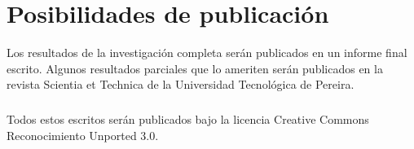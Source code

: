 \chapter{Posibilidades de publicaci\'on}
\label{sec:posibilidades}
Los resultados de la investigaci\'on completa ser\'an publicados en un informe final escrito. Algunos resultados parciales que lo ameriten ser\'an publicados en la revista Scientia et Technica de la Universidad Tecnol\'ogica de Pereira.
\paragraph{}
Todos estos escritos ser\'an publicados bajo la licencia Creative Commons Reconocimiento Unported 3.0.
\pagebreak